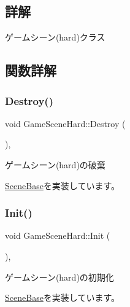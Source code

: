 \subsection{詳解}
ゲームシーン(hard)クラス 

\subsection{関数詳解}
\mbox{\label{class_game_scene_hard_a7a2ddc79c737ede4d1125d352c5756c1}} 
\subsubsection{\texorpdfstring{Destroy()}{Destroy()}}
{\footnotesize\ttfamily void Game\+Scene\+Hard\+::\+Destroy (\begin{DoxyParamCaption}{ }\end{DoxyParamCaption})\hspace{0.3cm}{\ttfamily [final]}, {\ttfamily [virtual]}}



ゲームシーン(hard)の破棄 



\mbox{\hyperlink{class_scene_base_a7c5b54020bc519b4dadfe9770d6b27f7}{Scene\+Base}}を実装しています。

\mbox{\label{class_game_scene_hard_affc2e6a09c13a625730eeb0e742cb22a}} 
\subsubsection{\texorpdfstring{Init()}{Init()}}
{\footnotesize\ttfamily void Game\+Scene\+Hard\+::\+Init (\begin{DoxyParamCaption}{ }\end{DoxyParamCaption})\hspace{0.3cm}{\ttfamily [final]}, {\ttfamily [virtual]}}



ゲームシーン(hard)の初期化 



\mbox{\hyperlink{class_scene_base_a24d7db43c819924dc8b07b436f6d3148}{Scene\+Base}}を実装しています。


